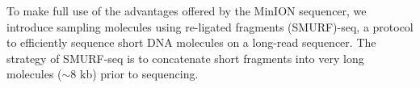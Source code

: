 To make full use of the advantages offered by the MinION sequencer, we
introduce sampling molecules using re-ligated fragments (SMURF)-seq, a
protocol to efficiently sequence short DNA molecules on a long-read
sequencer. The strategy of SMURF-seq is to concatenate short fragments
into very long molecules ($\sim$8 kb) prior to sequencing.
